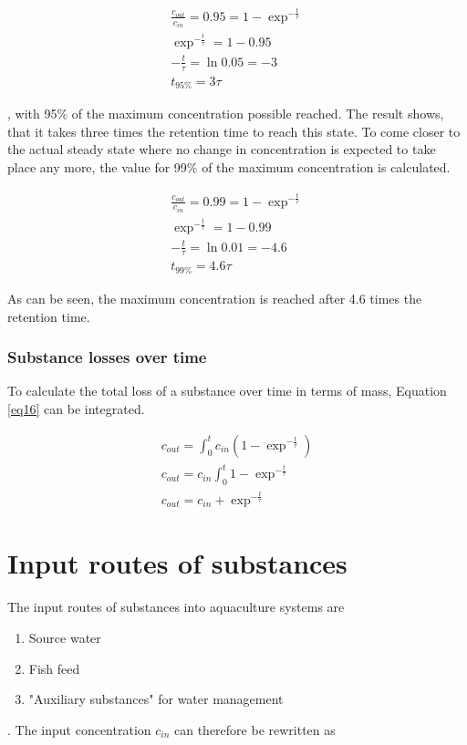 \documentclass{scrartcl}
\begin{document}
\begin{align}
	\frac{c_{out}}{c_{in}} = 0.95 = 1 - \exp^{-\frac{t}{\tau}}\\
	\exp^{-\frac{t}{\tau}} = 1 - 0.95\\
	-\frac{t}{\tau} = \ln{0.05} = -3\\
	t_{95\%} = 3\tau
\end{align}

, with 95\% of the maximum concentration possible reached. The result shows, that it takes three times the retention time to reach this state. To come closer to the actual steady state where no change in concentration is expected to take place any more, the value for 99\%  of the maximum concentration is calculated.

\begin{align}
	\frac{c_{out}}{c_{in}} = 0.99 = 1 - \exp^{-\frac{t}{\tau}}\\
	\exp^{-\frac{t}{\tau}} = 1 - 0.99\\
	-\frac{t}{\tau} = \ln{0.01} = -4.6\\
	t_{99\%} = 4.6\tau
\end{align}

As can be seen, the maximum concentration is reached after 4.6 times the retention time.



\subsubsection{Substance losses over time}
To calculate the total loss of a substance over time in terms of mass, Equation \ref{eq16} can be integrated.


\begin{align}
	c_{out} = \int_{0}^{t} c_{in}(1 - \exp^{-\frac{t}{\tau}})\\
	c_{out} = c_{in}\int_{0}^{t} 1 - \exp^{-\frac{t}{\tau}}\\
	c_{out} = c_{in} + \exp^{-\frac{t}{\tau}}
\end{align}


\section{Input routes of substances}
The input routes of substances into aquaculture systems are 
\begin{enumerate}
	\item Source water
	\item Fish feed
	\item "Auxiliary substances" for water management
\end{enumerate}
. The input concentration $c_{in}$ can therefore be rewritten as
\end{document}
